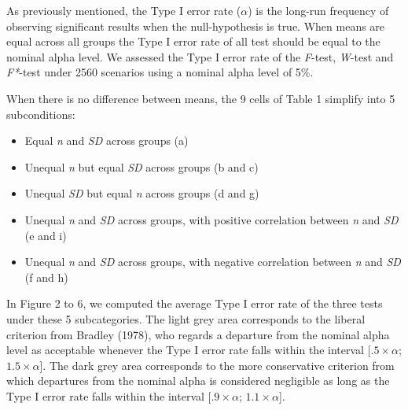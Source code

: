 \documentclass[man,floatsintext]{apa6}
\providecommand{\tightlist}{%
  \setlength{\itemsep}{0pt}\setlength{\parskip}{0pt}}
\begin{document}
As previously mentioned, the Type I error rate (\(\alpha\)) is the long-run frequency of observing significant results when the null-hypothesis is true. When means are equal across all groups the Type I error rate of all test should be equal to the nominal alpha level. We assessed the Type I error rate of the \emph{F}-test, \emph{W}-test and \emph{F*}-test under 2560 scenarios using a nominal alpha level of 5\%.

When there is no difference between means, the 9 cells of Table 1 simplify into 5 subconditions:

\begin{itemize}
\tightlist
\item
  Equal \emph{n} and \emph{SD} across groups (a)\\
\item
  Unequal \emph{n} but equal \emph{SD} across groups (b and c)\\
\item
  Unequal \emph{SD} but equal \emph{n} across groups (d and g)\\
\item
  Unequal \emph{n} and \emph{SD} across groups, with positive correlation between \emph{n} and \emph{SD} (e and i)\\
\item
  Unequal \emph{n} and \emph{SD} across groups, with negative correlation between \emph{n} and \emph{SD} (f and h)
\end{itemize}

In Figure 2 to 6, we computed the average Type I error rate of the three tests under these 5 subcategories. The light grey area corresponds to the liberal criterion from Bradley (1978), who regards a departure from the nominal alpha level as acceptable whenever the Type I error rate falls within the interval {[}\(.5 \times \alpha\); \(1.5 \times \alpha\){]}. The dark grey area corresponds to the more conservative criterion from which departures from the nominal alpha is considered negligible as long as the Type I error rate falls within the interval {[}\(.9 \times \alpha\); \(1.1 \times \alpha\){]}.
\end{document}
